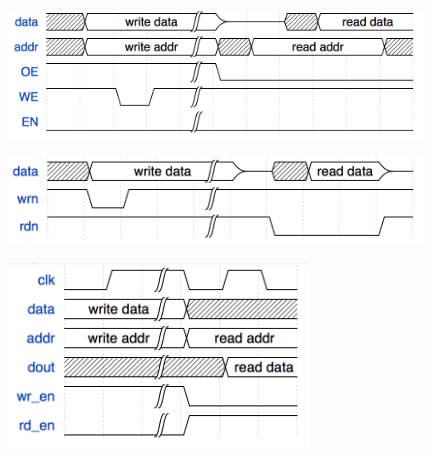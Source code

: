 \begin{center}
    \includegraphics[width=11cm]{image/device/sram}
\end{center}


\begin{center}
    \includegraphics[width=11cm]{image/device/serial}
\end{center}


\begin{center}
    \includegraphics[width=8cm]{image/device/vga}
\end{center}


